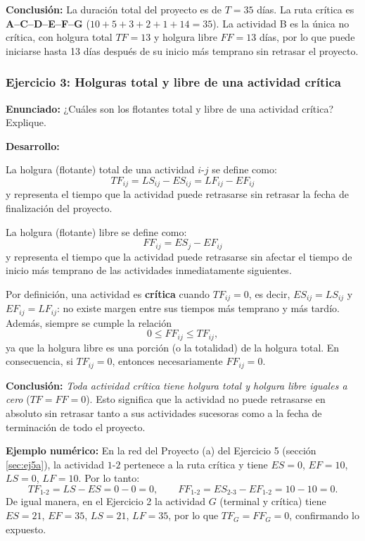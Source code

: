\documentclass{article}
\begin{document}
\textbf{Conclusión:} La duración total del proyecto es de $T = 35$ días. La ruta crítica es \textbf{A--C--D--E--F--G} ($10+5+3+2+1+14=35$). La actividad B es la única no crítica, con holgura total $TF=13$ y holgura libre $FF=13$ días, por lo que puede iniciarse hasta 13 días después de su inicio más temprano sin retrasar el proyecto.

\subsubsection{Ejercicio 3: Holguras total y libre de una actividad crítica}

\textbf{Enunciado:} ¿Cuáles son los flotantes total y libre de una actividad crítica? Explique.

\textbf{Desarrollo:}

La holgura (flotante) total de una actividad $i$-$j$ se define como:
\[
TF_{ij} = LS_{ij} - ES_{ij} = LF_{ij} - EF_{ij}
\]
y representa el tiempo que la actividad puede retrasarse sin retrasar la fecha de finalización del proyecto.

La holgura (flotante) libre se define como:
\[
FF_{ij} = ES_{j} - EF_{ij}
\]
y representa el tiempo que la actividad puede retrasarse sin afectar el tiempo de inicio más temprano de las actividades inmediatamente siguientes.

Por definición, una actividad es \textbf{crítica} cuando $TF_{ij}=0$, es decir, $ES_{ij}=LS_{ij}$ y $EF_{ij}=LF_{ij}$: no existe margen entre sus tiempos más temprano y más tardío. Además, siempre se cumple la relación
\[
0 \le FF_{ij} \le TF_{ij},
\]
ya que la holgura libre es una porción (o la totalidad) de la holgura total. En consecuencia, si $TF_{ij}=0$, entonces necesariamente $FF_{ij}=0$.

\textbf{Conclusión:} \textit{Toda actividad crítica tiene holgura total y holgura libre iguales a cero} ($TF=FF=0$). Esto significa que la actividad no puede retrasarse en absoluto sin retrasar tanto a sus actividades sucesoras como a la fecha de terminación de todo el proyecto.

\textbf{Ejemplo numérico:} En la red del Proyecto (a) del Ejercicio 5 (sección \ref{sec:ej5a}), la actividad $1$-$2$ pertenece a la ruta crítica y tiene $ES=0$, $EF=10$, $LS=0$, $LF=10$. Por lo tanto:
\[
TF_{1\text{-}2} = LS-ES = 0-0 = 0, \qquad FF_{1\text{-}2} = ES_{2\text{-}3}-EF_{1\text{-}2} = 10-10 = 0.
\]
De igual manera, en el Ejercicio 2 la actividad $G$ (terminal y crítica) tiene $ES=21$, $EF=35$, $LS=21$, $LF=35$, por lo que $TF_G=FF_G=0$, confirmando lo expuesto.
\end{document}
